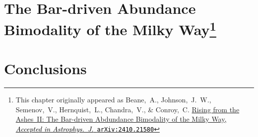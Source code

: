 \documentclass[11pt]{gsasthesis} %
\newcommand{\arxivaccept}[3]{\href{http://arxiv.org/abs/#1}{{#2}\textcolor{black}{, \textit{Accepted in #3}}\ \textcolor{black}{\texttt{arXiv:#1}}}}
\begin{document}
\chapter{The Bar-driven Abundance Bimodality of the Milky Way\footnote{This chapter originally appeared as Beane,~A., Johnson,~J.~W., Semenov,~V., Hernquist,~L., Chandra,~V., \& Conroy,~C. \arxivaccept{2410.21580}{Rising from the Ashes~II: The Bar-driven Abdundance Bimodality of the Milky Way}{Astrophys.~J.}}}\label{ch:Mgdec}


\chapter{Conclusions}\label{ch:conclusions}




\begin{singlespacing}
  \renewcommand{\bibname}{References}

  
  
\end{singlespacing}


\end{document}
